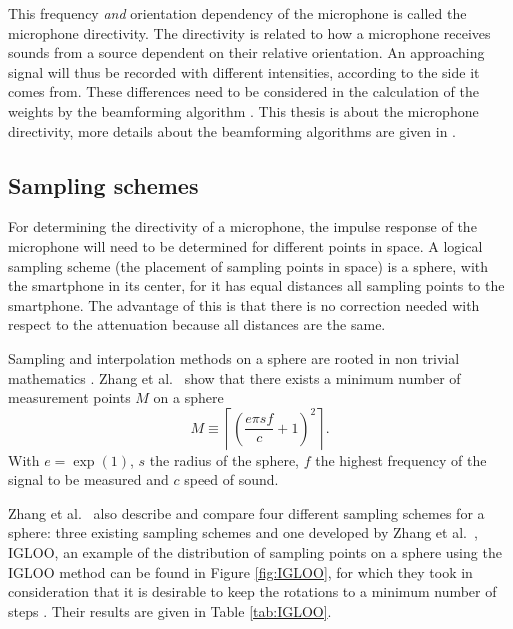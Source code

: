 This frequency \textit{and} orientation dependency of the microphone is called the microphone directivity. 
The directivity is related to how a microphone receives sounds from a source dependent on their relative orientation. 
An approaching signal will thus be recorded with different intensities, according to the side it comes from.
These differences need to be considered in the calculation of the weights by the beamforming algorithm \cite{Gaubitch2014,thomas2012optimal} . 
This thesis is about the microphone directivity, more details about the beamforming algorithms are given in \cite{BAP:ErikNiels}. 

\subsection{Sampling schemes}
\label{sec:rel_res:sampl_sch}
For determining the directivity of a microphone, the impulse response of the microphone will need to be determined for different points in space.
A logical sampling scheme (the placement of sampling points in space) is a sphere, with the smartphone in its center, for it has equal distances all sampling points to the smartphone.
The advantage of this is that there is no correction needed with respect to the attenuation because all distances are the same.

Sampling and interpolation methods on a sphere are rooted in non trivial mathematics \cite{Marzo2014}. Zhang et al.\ \cite{Zhang2012575} show that there exists a minimum number of measurement points $M$ on a sphere 
\begin{equation}
\label{eqn:minimum}
M\equiv\left\lceil\left(\dfrac{e\pi sf}{c}+1\right)^2\right\rceil.
\end{equation}
With $e=\exp(1)$, $s$ the radius of the sphere, $f$ the highest frequency of the signal to be measured and $c$ speed of sound.

Zhang et al.\ \cite{Zhang2012575} also describe and compare four different sampling schemes for a sphere: three existing sampling schemes and one developed by Zhang et al.\ \cite{Zhang2012575}, IGLOO, an example of the distribution of sampling points on a sphere using the IGLOO method can be found in Figure \ref{fig:IGLOO}, for which they took in consideration that it is desirable to keep the rotations to a minimum number of steps \cite{Zhang2012575}. Their results are given in Table \ref{tab:IGLOO}.

